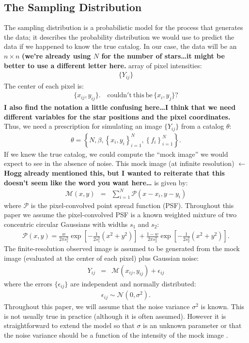 \documentclass[letterpaper, 11pt]{article}
\begin{document}
\subsection{The Sampling Distribution}
The sampling distribution is a probabilistic model for the process that
generates the data; it describes the probability distribution we would use
to predict the data if we happened to know the true catalog. In our case,
the data will be an $n \times n$ {\bf (we're already using $N$ for the
number of stars\ldots it might be better to use a different letter here.}
array of pixel intensities:
\begin{eqnarray}
\{Y_{ij}\}
\end{eqnarray}
The center of each pixel is:
\begin{eqnarray}
    \{x_{ij}, y_{ij}\}. \quad \mathrm{couldn't~this~be}\,\{x_i, y_j\}?
\end{eqnarray}
{\bf I also find the notation a little confusing here\ldots I think that we
need different variables for the star positions and the pixel coordinates.}
Thus, we need
a prescription for simulating an image $\{Y_{ij}\}$ from a catalog $\theta$:
\begin{eqnarray}
\theta = \left\{N, \beta, \left\{x_i, y_i\right\}_{i=1}^N,
\left\{f_i\right\}_{i=1}^N\right\}.
\end{eqnarray}
If we knew the true catalog, we could compute the
``mock image'' we would expect to see
in the absence of noise. This mock image (at infinite resolution)
{\bf $\gets$ Hogg already mentioned this, but I wanted to reiterate that
this doesn't seem like the word you want here\ldots}
is given by:
\begin{eqnarray}
\mathcal{M}(x, y) &=& \sum_{i=1}^N \mathcal{P}(x - x_i, y - y_i)
\end{eqnarray}
where $\mathcal{P}$ is the pixel-convolved point spread function (PSF).
Throughout this paper we
assume the pixel-convolved PSF is a known weighted mixture of two concentric
circular
Gaussians with widths $s_1$ and $s_2$:
\begin{eqnarray}
\mathcal{P}(x, y) = \frac{w}{2\pi s_1^2}\exp
\left[
-\frac{1}{2s_1^2}\left(x^2 + y^2\right)
\right]
+ \frac{1-w}{2\pi s_2^2}\exp
\left[-\frac{1}{2s_2^2}\left(x^2 + y^2\right)
\right].
\end{eqnarray}
The finite-resolution observed image is assumed to be generated from the mock
image (evaluated at the center of each pixel) plus Gaussian noise:
\begin{eqnarray}
Y_{ij} &=& \mathcal{M}(x_{ij}, y_{ij}) + \epsilon_{ij}
\end{eqnarray}
where the errors $\{\epsilon_{ij}\}$ are independent and normally distributed:
\begin{eqnarray}
\epsilon_{ij} \sim \mathcal{N}(0, \sigma^2).
\end{eqnarray}
Throughout this paper, we will assume that the noise variance $\sigma^2$ is
known. This is not usually true in practice (although it is often assumed).
However it is straightforward to extend the model so that $\sigma$ is an
unknown parameter or that the noise variance should be a function of the
intensity of the mock image \citep[e.g.][]{2011MNRAS.412.2521B}.
\end{document}
